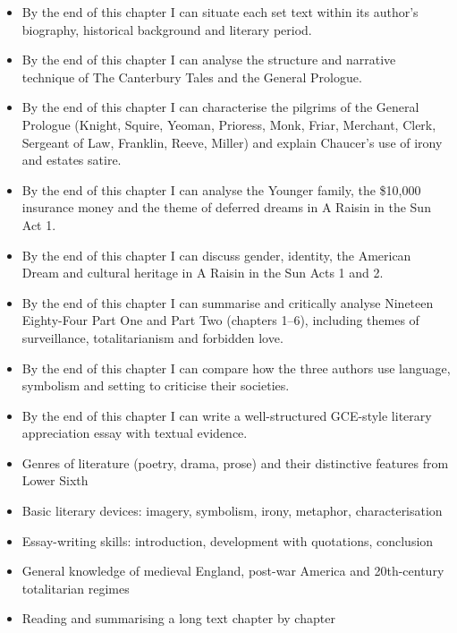\documentclass[11pt]{article}
\begin{document}
\begin{objectifs}
\begin{itemize}
\item By the end of this chapter I can situate each set text within its author's biography, historical background and literary period.
\item By the end of this chapter I can analyse the structure and narrative technique of The Canterbury Tales and the General Prologue.
\item By the end of this chapter I can characterise the pilgrims of the General Prologue (Knight, Squire, Yeoman, Prioress, Monk, Friar, Merchant, Clerk, Sergeant of Law, Franklin, Reeve, Miller) and explain Chaucer's use of irony and estates satire.
\item By the end of this chapter I can analyse the Younger family, the \$10,000 insurance money and the theme of deferred dreams in A Raisin in the Sun Act 1.
\item By the end of this chapter I can discuss gender, identity, the American Dream and cultural heritage in A Raisin in the Sun Acts 1 and 2.
\item By the end of this chapter I can summarise and critically analyse Nineteen Eighty-Four Part One and Part Two (chapters 1–6), including themes of surveillance, totalitarianism and forbidden love.
\item By the end of this chapter I can compare how the three authors use language, symbolism and setting to criticise their societies.
\item By the end of this chapter I can write a well-structured GCE-style literary appreciation essay with textual evidence.
\end{itemize}
\end{objectifs}

\begin{prerequis}
\begin{itemize}
\item Genres of literature (poetry, drama, prose) and their distinctive features from Lower Sixth
\item Basic literary devices: imagery, symbolism, irony, metaphor, characterisation
\item Essay-writing skills: introduction, development with quotations, conclusion
\item General knowledge of medieval England, post-war America and 20th-century totalitarian regimes
\item Reading and summarising a long text chapter by chapter
\end{itemize}
\end{prerequis}
\end{document}
